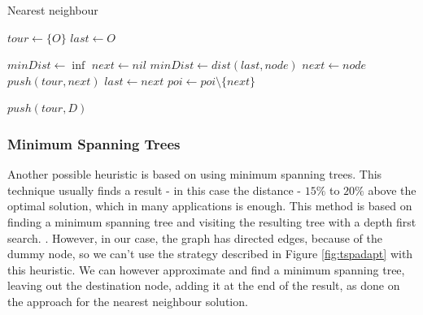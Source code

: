 \documentclass[a4paper, 12pt]{report}
\begin{document}
    \begin{algorithm}
    	\caption{Nearest neighbour} 
    	\label{alg:nearest}
	    \begin{algorithmic}[1]
		
		\State $tour \leftarrow \{O\}$
        \State $last \leftarrow O$ 
        
		    \State $minDist \leftarrow \inf$
		    \State $next \leftarrow nil$
                    \State $minDist \leftarrow dist(last, node)$
                    \State $next \leftarrow node$
                \EndIf
		    \EndFor
		    \State $push(tour, next)$
		    \State $last \leftarrow next$
		    \State $poi \leftarrow poi \setminus \{next\}$
		\EndWhile

        \State $push(tour, D)$
		
	    \end{algorithmic} 
	\end{algorithm}
    
    \pagebreak

    
    \subsubsection{Minimum Spanning Trees} \label{minkruskal}
    
    Another possible heuristic is based on using minimum spanning trees. This technique usually finds a result - in this case the distance - $15\%$ to $20\%$ above the optimal solution, which in many applications is enough. This method is based on finding a minimum spanning tree and visiting the resulting tree with a depth first search. \cite{skienna1}. However, in our case, the graph has directed edges, because of the dummy node, so we can't use the strategy described in Figure \ref{fig:tspadapt} with this heuristic. We can however approximate and find a minimum spanning tree, leaving out the destination node, adding it at the end of the result, as done on the approach for the nearest neighbour solution.
    
\end{document}
